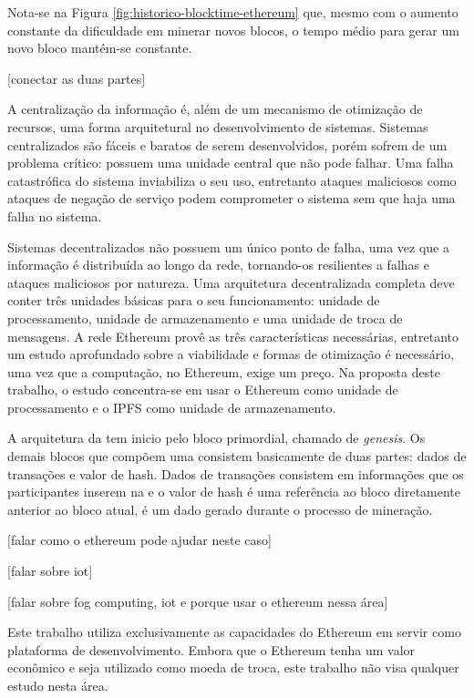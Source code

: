 \documentclass[tcc,capa]{texufpel}
\begin{document}
	Nota-se na Figura \ref{fig:historico-blocktime-ethereum} que, mesmo com o aumento constante da dificuldade em minerar novos blocos, o tempo médio para gerar um novo bloco mantém-se constante.
	
	[conectar as duas partes]
	
	A centralização da informação é, além de um mecanismo de otimização de recursos, uma forma arquitetural no desenvolvimento de sistemas. Sistemas centralizados são fáceis e baratos de serem desenvolvidos, porém sofrem de um problema crítico: possuem uma unidade central que não pode falhar. Uma falha catastrófica do sistema inviabiliza o seu uso, entretanto ataques maliciosos como ataques de negação de serviço podem comprometer o sistema sem que haja uma falha no sistema.
	
    Sistemas decentralizados não possuem um único ponto de falha, uma vez que a informação é distribuída ao longo da rede, tornando-os resilientes a falhas e ataques maliciosos por natureza. Uma arquitetura decentralizada completa deve conter três unidades básicas para o seu funcionamento: unidade de processamento, unidade de armazenamento e uma unidade de troca de mensagens. A rede Ethereum provê as três características necessárias, entretanto um estudo aprofundado sobre a viabilidade e formas de otimização é necessário, uma vez que a computação, no Ethereum, exige um preço. Na proposta deste trabalho, o estudo concentra-se em usar o Ethereum como unidade de processamento e o IPFS como unidade de armazenamento.
    
    A arquitetura da \bchain tem inicio pelo bloco primordial, chamado de \textit{genesis}. Os demais blocos que compõem uma \bchain consistem basicamente de duas partes: dados de transações e valor de hash. Dados de transações consistem em informações que os participantes inserem na \bchain e o valor de hash é uma referência ao bloco diretamente anterior ao bloco atual, é um dado gerado durante o processo de mineração.
	
	[falar como o ethereum pode ajudar neste caso]
	
	[falar sobre iot]
	
	[falar sobre fog computing, iot e porque usar o ethereum nessa área]
	
	Este trabalho utiliza exclusivamente as capacidades do Ethereum em servir como plataforma de desenvolvimento. Embora que o Ethereum tenha um valor econômico e seja utilizado como moeda de troca, este trabalho não visa qualquer estudo nesta área. 
	
\end{document}
